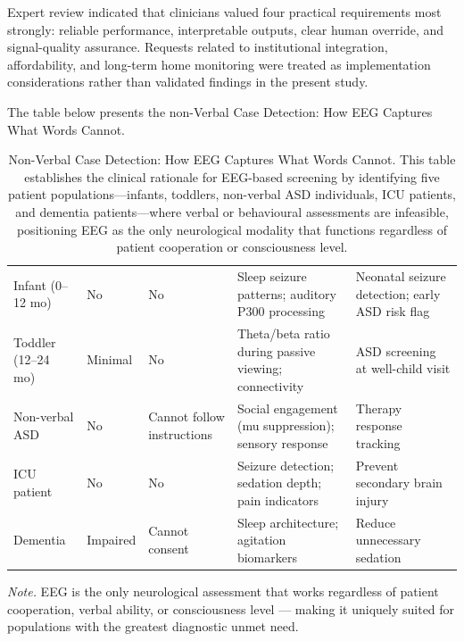 \noindent Expert review indicated that clinicians valued four practical requirements most strongly: reliable performance, interpretable outputs, clear human override, and signal-quality assurance. Requests related to institutional integration, affordability, and long-term home monitoring were treated as implementation considerations rather than validated findings in the present study.



\noindent The table below presents the non-Verbal Case Detection: How EEG Captures What Words Cannot.

\begin{table}[!htbp]
\tablestripes\tablefontsize
\tablefontsize
\caption[Non-Verbal Case Detection: How EEG Captures What Words]{Non-Verbal Case Detection: How EEG Captures What Words Cannot. This table establishes the clinical rationale for EEG-based screening by identifying five patient populations---infants, toddlers, non-verbal ASD individuals, ICU patients, and dementia patients---where verbal or behavioural assessments are infeasible, positioning EEG as the only neurological modality that functions regardless of patient cooperation or consciousness level.}
\begin{tabularx}{\textwidth}{@{} >{\raggedright\arraybackslash}p{2.2cm} >{\raggedright\arraybackslash}p{1.5cm} >{\raggedright\arraybackslash}p{1.5cm} L L @{}}
\toprule
{} &  &  &  &  \\
\midrule
Infant (0--12 mo) & No & No & Sleep seizure patterns; auditory P300 processing & Neonatal seizure detection; early ASD risk flag \\
\addlinespace
Toddler (12--24 mo) & Minimal & No & Theta/beta ratio during passive viewing; connectivity & ASD screening at well-child visit \\
\addlinespace
Non-verbal ASD & No & Cannot follow instructions & Social engagement (mu suppression); sensory response & Therapy response tracking \\
\addlinespace
ICU patient & No & No & Seizure detection; sedation depth; pain indicators & Prevent secondary brain injury \\
\addlinespace
Dementia & Impaired & Cannot consent & Sleep architecture; agitation biomarkers & Reduce unnecessary sedation \\
\bottomrule
\end{tabularx}
\vspace{0.5em}\noindent\textit{Note.} EEG is the only neurological assessment that works regardless of patient cooperation, verbal ability, or consciousness level --- making it uniquely suited for populations with the greatest diagnostic unmet need.
\end{table}


